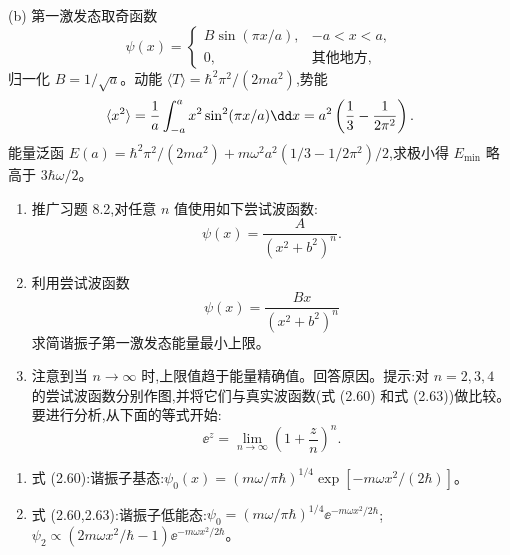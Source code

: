 \begin{solution}
(b) 第一激发态取奇函数
\[
\psi(x)=\begin{cases}
B\sin(\pi x/a), & -a<x<a,\\
0, & \text{其他地方},
\end{cases}
\]
归一化 $B=1/\sqrt{a}$。动能 $\langle T\rangle=\hbar^2\pi^2/(2ma^2)$,势能
\[
\langle x^2\rangle={1\over a}\int_{-a}^a x^2\sin^2(\pi x/a)\dd x=a^2\left({1\over3}-{1\over2\pi^2}\right).
\]
能量泛函 $E(a)=\hbar^2\pi^2/(2ma^2)+m\omega^2a^2(1/3-1/2\pi^2)/2$,求极小得 $E_{\min}$ 略高于 $3\hbar\omega/2$。
\end{solution}

\begin{question}
\begin{enumerate}
\item 推广习题 8.2,对任意 $n$ 值使用如下尝试波函数:
\[
\psi(x)=\frac{A}{(x^2+b^2)^n}.
\]
\item 利用尝试波函数
\[
\psi(x)=\frac{Bx}{(x^2+b^2)^n}
\]
求简谐振子第一激发态能量最小上限。
\item 注意到当 $n\to\infty$ 时,上限值趋于能量精确值。回答原因。提示:对 $n=2,3,4$ 的尝试波函数分别作图,并将它们与真实波函数(式 (2.60) 和式 (2.63))做比较。要进行分析,从下面的等式开始:
\[
 \ee^z=\lim_{n\to\infty}\left(1+\frac{z}{n}\right)^n.
\]
\end{enumerate}

\par\smallskip
{}
\begin{enumerate}[leftmargin=2.2em,itemsep=0.12em,topsep=0.12em,parsep=0pt]
\item 式 (2.60):谐振子基态:$\psi_0(x)=(m\omega/\pi\hbar)^{1/4}\exp[-m\omega x^2/(2\hbar)]$。
\item 式 (2.60,2.63):谐振子低能态:$\psi_0=(m\omega/\pi\hbar)^{1/4}\ee^{-m\omega x^2/2\hbar}$;$\psi_2\propto(2m\omega x^2/\hbar-1)\ee^{-m\omega x^2/2\hbar}$。
\end{enumerate}

\end{question}
